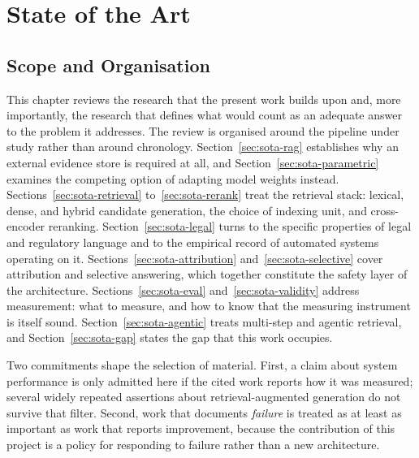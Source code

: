 \chapter{State of the Art}
\label{chap:sota}


\section{Scope and Organisation}
\label{sec:sota-scope}

This chapter reviews the research that the present work builds upon and, more importantly, the research that defines what would count as an adequate answer to the problem it addresses. The review is organised around the pipeline under study rather than around chronology. Section~\ref{sec:sota-rag} establishes why an external evidence store is required at all, and Section~\ref{sec:sota-parametric} examines the competing option of adapting model weights instead. Sections~\ref{sec:sota-retrieval} to~\ref{sec:sota-rerank} treat the retrieval stack: lexical, dense, and hybrid candidate generation, the choice of indexing unit, and cross-encoder reranking. Section~\ref{sec:sota-legal} turns to the specific properties of legal and regulatory language and to the empirical record of automated systems operating on it. Sections~\ref{sec:sota-attribution} and~\ref{sec:sota-selective} cover attribution and selective answering, which together constitute the safety layer of the architecture. Sections~\ref{sec:sota-eval} and~\ref{sec:sota-validity} address measurement: what to measure, and how to know that the measuring instrument is itself sound. Section~\ref{sec:sota-agentic} treats multi-step and agentic retrieval, and Section~\ref{sec:sota-gap} states the gap that this work occupies.

Two commitments shape the selection of material. First, a claim about system performance is only admitted here if the cited work reports how it was measured; several widely repeated assertions about retrieval-augmented generation do not survive that filter. Second, work that documents \emph{failure} is treated as at least as important as work that reports improvement, because the contribution of this project is a policy for responding to failure rather than a new architecture.

